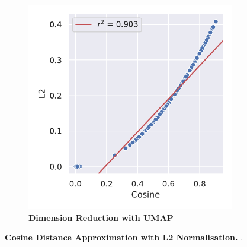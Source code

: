 \begin{figure}
\begin{adjustbox}{minipage=\dimexpr{}\fboxrule,fbox}
\begin{subfigure}[b]{0.475\textwidth}
            \includegraphics[width=\textwidth]{UMAP/Difference_Distance_Calculation.pdf}
            \caption[Dimension Reduction with UMAP]{\textbf{Dimension Reduction with UMAP}}
            \label{fig:2.4.1b}
        \end{subfigure}
    \end{adjustbox}
    \caption[Cosine Distance Approximation with L2 Normalisation]{\textbf{Cosine Distance Approximation with L2 Normalisation.} .}
    \label{fig:2.4.1}
\end{figure}